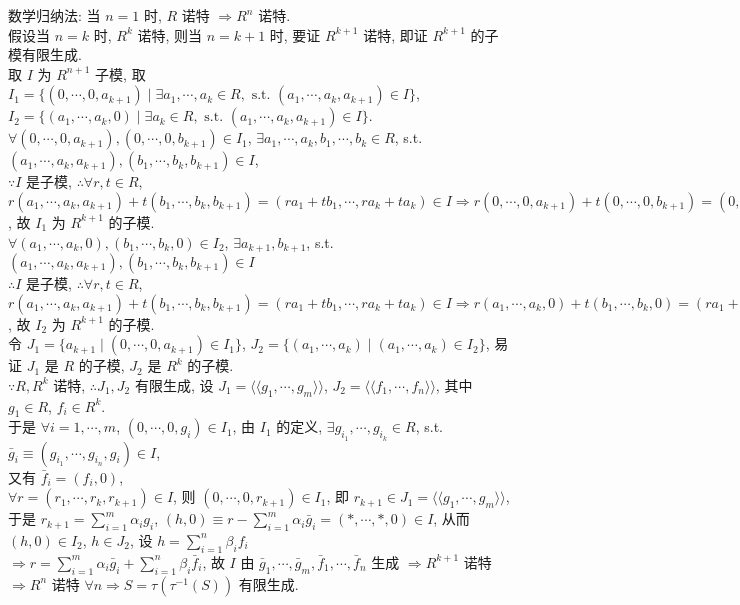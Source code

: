 \documentclass{note}
\begin{document}
\begin{pf}
    数学归纳法: 当 $n=1$ 时, $R$ 诺特 $\Longrightarrow R^n$ 诺特.\\
    假设当 $n=k$ 时, $R^k$ 诺特, 则当 $n=k+1$ 时, 要证 $R^{k+1}$ 诺特, 即证 $R^{k+1}$ 的子模有限生成.\\
    取 $I$ 为 $R^{n+1}$ 子模, 取 $I_1=\{(0,\cdots,0,a_{k+1})\mid\exists a_1,\cdots,a_k\in R,\text{ s.t. }(a_1,\cdots,a_k,a_{k+1})\in I\}$, $I_2=\{(a_1,\cdots,a_k,0)\mid\exists a_k\in R,\text{ s.t. }(a_1,\cdots,a_k,a_{k+1})\in I\}$.\\
    $\forall(0,\cdots,0,a_{k+1}),(0,\cdots,0,b_{k+1})\in I_1$, $\exists a_1,\cdots,a_k,b_1,\cdots,b_k\in R$, s.t. $(a_1,\cdots,a_k,a_{k+1}),(b_1,\cdots,b_k,b_{k+1})\in I$,\\
    $\because I$ 是子模, $\therefore\forall r,t\in R$, $r(a_1,\cdots,a_k,a_{k+1})+t(b_1,\cdots,b_k,b_{k+1})=(ra_1+tb_1,\cdots,ra_k+ta_k)\in I\Longrightarrow r(0,\cdots,0,a_{k+1})+t(0,\cdots,0,b_{k+1})=(0,\cdots,0,ra_{k+1}+tb_{k+1})\in I_2$, 故 $I_1$ 为 $R^{k+1}$ 的子模.\\
    $\forall(a_1,\cdots,a_k,0),(b_1,\cdots,b_k,0)\in I_2$, $\exists a_{k+1},b_{k+1}$, s.t. $(a_1,\cdots,a_k,a_{k+1}),(b_1,\cdots,b_k,b_{k+1})\in I$\\
    $\therefore I$ 是子模, $\therefore\forall r,t\in R$, $r(a_1,\cdots,a_k,a_{k+1})+t(b_1,\cdots,b_k,b_{k+1})=(ra_1+tb_1,\cdots,ra_k+ta_k)\in I\Longrightarrow r(a_1,\cdots,a_k,0)+t(b_1,\cdots,b_k,0)=(ra_1+tb_1,\cdots,ra_k+tb_k,0)\in I_2$, 故 $I_2$ 为 $R^{k+1}$ 的子模.\\
    令 $J_1=\{a_{k+1}\mid(0,\cdots,0,a_{k+1})\in I_1\}$, $J_2=\{(a_1,\cdots,a_k)\mid(a_1,\cdots,a_k)\in I_2\}$, 易证 $J_1$ 是 $R$ 的子模, $J_2$ 是 $R^k$ 的子模.\\
    $\because R,R^k$ 诺特, $\therefore J_1,J_2$ 有限生成, 设 $J_1=\langle\langle g_1,\cdots,g_m\rangle\rangle$, $J_2=\langle\langle f_1,\cdots,f_n\rangle\rangle$, 其中 $g_1\in R$, $f_i\in R^k$.\\
    于是 $\forall i=1,\cdots,m$, $(0,\cdots,0,g_i)\in I_1$, 由 $I_1$ 的定义, $\exists g_{i_1},\cdots,g_{i_k}\in R$, s.t. $\bar{g}_i\equiv(g_{i_1},\cdots,g_{i_n},g_i)\in I$,\\
    又有 $\bar{f}_i=(f_i,0)$,\\
    $\forall r=(r_1,\cdots,r_k,r_{k+1})\in I$, 则 $(0,\cdots,0,r_{k+1})\in I_1$, 即 $r_{k+1}\in J_1=\langle\langle g_1,\cdots,g_m\rangle\rangle$,\\
    于是 $r_{k+1}=\sum_{i=1}^m\alpha_ig_i$, $(h,0)\equiv r-\sum_{i=1}^m\alpha_i\bar{g}_i=(*,\cdots,*,0)\in I$, 从而 $(h,0)\in I_2$, $h\in J_2$, 设 $h=\sum_{i=1}^n\beta_if_i$\\
    $\Longrightarrow r=\sum_{i=1}^m\alpha_i\bar{g}_i+\sum_{i=1}^n\beta_i\bar{f}_i$, 故 $I$ 由 $\bar{g}_1,\cdots,\bar{g}_m,\bar{f}_1,\cdots,\bar{f}_n$ 生成 $\Longrightarrow R^{k+1}$ 诺特 $\Longrightarrow R^n$ 诺特 $\forall n\Longrightarrow S=\tau(\tau^{-1}(S))$ 有限生成.
\end{pf}
\end{document}
